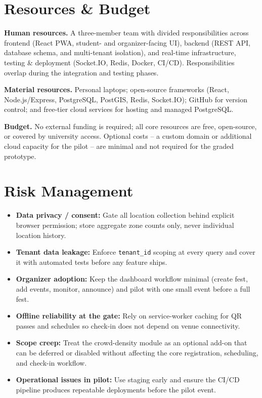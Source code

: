 \documentclass[11pt,a4paper]{article}
\begin{document}
\section{Resources \& Budget}

\textbf{Human resources.} A three-member team with divided responsibilities across
frontend (React PWA, student- and organizer-facing UI), backend (REST API, database
schema, and multi-tenant isolation), and real-time infrastructure, testing \& deployment
(Socket.IO, Redis, Docker, CI/CD). Responsibilities overlap during the integration and
testing phases.


\textbf{Material resources.} Personal laptops; open-source frameworks (React,
Node.js/Express, PostgreSQL, PostGIS, Redis, Socket.IO); GitHub for version control;
and free-tier cloud services for hosting and managed PostgreSQL.

\textbf{Budget.} No external funding is required; all core resources are free,
open-source, or covered by university access. Optional costs -- a custom domain or
additional cloud capacity for the pilot -- are minimal and not required for the graded
prototype.

\section{Risk Management}

\begin{itemize}
    \item \textbf{Data privacy / consent:} Gate all location collection behind explicit
    browser permission; store aggregate zone counts only, never individual location
    history.
    \item \textbf{Tenant data leakage:} Enforce \texttt{tenant\_id} scoping at every
    query and cover it with automated tests before any feature ships.
    \item \textbf{Organizer adoption:} Keep the dashboard workflow minimal (create
    fest, add events, monitor, announce) and pilot with one small event before a full
    fest.
    \item \textbf{Offline reliability at the gate:} Rely on service-worker caching for
    QR passes and schedules so check-in does not depend on venue connectivity.
    \item \textbf{Scope creep:} Treat the crowd-density module as an optional add-on
    that can be deferred or disabled without affecting the core registration,
    scheduling, and check-in workflow.
    \item \textbf{Operational issues in pilot:} Use staging early and ensure the
    CI/CD pipeline produces repeatable deployments before the pilot event.
\end{itemize}
\end{document}
